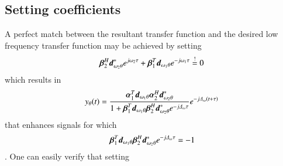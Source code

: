 \subsection*{Setting  coefficients}
A perfect match between the resultant transfer function and the desired low frequency transfer function may be achieved by setting 
\begin{align}
    \label{eqn_stabilityEnhancement_freqPairApproach_term1}
    \vecnot{\beta}_{2}^{H}\vecnot{d}^{*}_{\omega_{2}\theta}
    e^{j\omega_{2}\tau}
    +
    \vecnot{\beta}_{1}^{T}\vecnot{d}_{\omega_{1}\theta}
    e^{-j\omega_{1}\tau}
    \overset{!}{=} 0
\end{align}
which results in
\begin{align*}
    y_{\theta}(t)
    =
    \frac{
    \boldsymbol{\alpha}_{1}^{T}
    \boldsymbol{d}_{\omega_{1}\theta}
    \boldsymbol{\alpha}_{2}^{H}
    \boldsymbol{d}^{*}_{\omega_{2}\theta}
    }{
    1
    +
    \boldsymbol{\beta}_{1}^{T}\boldsymbol{d}_{\omega_{1}\theta}\boldsymbol{\beta}_{2}^{H}\boldsymbol{d}^{*}_{\omega_{2}\theta}
    e^{-j\Delta_{\omega}\tau}
    }
    e^{-j\Delta_{\omega}\left(t+\tau\right)}
\end{align*}
that enhances signals for which 
\begin{align}
    \label{eqn_stabilityEnhancement_freqPairApproach_term2}
    \vecnot{\beta}_{1}^{T}\vecnot{d}_{\omega_{1}\theta}\vecnot{\beta}_{2}^{H}\vecnot{d}^{*}_{\omega_{2}\theta}e^{-j\Delta_{\omega}\tau} = -1
\end{align}.
One can easily verify that setting
\ifdefined\showDev
    \\
